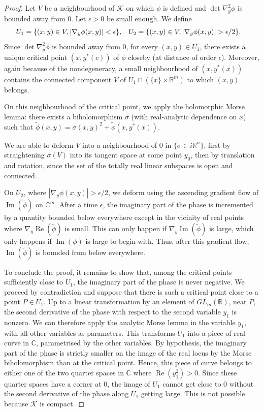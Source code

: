 \documentclass[AHL,Unicode,longabstracts,published]{cedram}
\DeclareMathOperator{\re}{Re}
\DeclareMathOperator{\im}{Im}
\newcommand{\clK}{\mathcal{K}}
\newcommand\1{\mathds{1}}
\newcommand{\R}{\mathbb{R}}
\newcommand{\C}{\mathbb{C}}
\let\originalleft\left
\let\originalright\right
\renewcommand{\left}{\mathopen{}\mathclose\bgroup\originalleft}
\renewcommand{\right}{\aftergroup\egroup\originalright}
\begin{document}
\begin{proof}
Let $V$ be a neighbourhood of $\clK$ on which $\phi$ is defined and $\det\nabla^2_y\phi$ is bounded away from $0$. Let $\epsilon>0$ be small enough. We define
\begin{align*}
&U_1=\left\{(x,y)\in V, |\nabla_y\phi(x,y)|< \epsilon \right\},& &U_2= \left\{(x,y)\in V, |\nabla_y\phi(x,y)|> \epsilon/2\right\}.
\end{align*}
Since $\det\nabla^2_y\phi$ is bounded away from $0$, for every $(x,y)\in U_1$, there exists a unique critical point $(x,y^*(c))$ of $\phi$ closeby (at distance of order $\epsilon$). Moreover, again because of the nondegeneracy, a small neighbourhood of $(x,y^*(x))$ contains the connected component $V$ of $U_1\cap (\{x\}\times \R^m)$ to which $(x,y)$ belongs.

On this neighbourhood of the critical point, we apply the holomorphic Morse lemma: there exists a biholomorphism $\sigma$ (with real-analytic dependence on $x$) such that $\widetilde{\phi}(x,y)=\sigma(x,y)^2+\widetilde{\phi}(x,y^*(x))$.

We are able to deform $V$ into a neighbourhood of $0$ in $\{\sigma\in i\R^n\}$, first by straightening $\sigma(V)$ into its tangent space at some point $y_0$, then by translation and rotation, since the set of the totally real linear subspaces is open and connected.

On $U_2$, where $|\nabla_y\phi(x,y)|>\epsilon/2$, we deform using the ascending gradient flow of $\im(\widetilde{\phi})$ on $\C^m$. After a time $\epsilon$, the imaginary part of the phase is incremented by a quantity bounded below everywhere except in the vicinity of real points where $\nabla_y\re(\widetilde{\phi})$ is small. This can only happen if $\nabla_y\im(\widetilde{\phi})$ is large, which only happens if $\im(\phi)$ is large to begin with. Thus, after this gradient flow, $\im(\widetilde{\phi})$ is bounded from below everywhere.

To conclude the proof, it remains to show that, among the critical points sufficiently close to $U_1$, the imaginary part of the phase is never negative. We proceed by contradiction and suppose that there is such a critical point close to a point $P\in U_1$. Up to a linear transformation by an element of $GL_m(\R)$, near $P$, the second derivative of the phase with respect to the second variable $y_1$ is nonzero. We can therefore apply the analytic Morse lemma in the variable $y_1$, with all other variables as parameters. This transforms $U_1$ into a piece of real curve in $\C$, parametrised by the other variables. By hypothesis, the imaginary part of the phase is strictly smaller on the image of the real locus by the Morse biholomorphism than at the critical point. Hence, this piece of curve belongs to either one of the two quarter spaces in $\C$ where $\re(y_1^2)>0$. Since these quarter spaces have a corner at $0$, the image of $U_1$ cannot get close to $0$ without the second derivative of the phase along $U_1$ getting large. This is not possible because $\clK$ is compact.
\end{proof}
\end{document}
